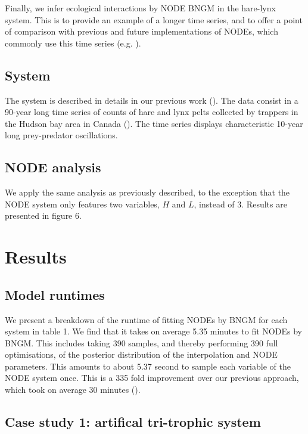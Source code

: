 \documentclass[11pt, oneside]{article}
\begin{document}
Finally, we infer ecological interactions by NODE BNGM in the hare-lynx system.
This is to provide an example of a longer time series, and to offer a point of comparison with previous and future implementations of NODEs, which commonly use this time series (e.g. \cite{Bonnaffe2021a}).

\subsection{System}

The system is described in details in our previous work (\cite{Bonnaffe2021a}).
The data consist in a 90-year long time series of counts of hare and lynx pelts collected by trappers in the Hudson bay area in Canada (\cite{Odum1972}).
The time series displays characteristic 10-year long prey-predator oscillations.

\subsection{NODE analysis}

We apply the same analysis as previously described, to the exception that the NODE system only features two variables, $H$ and $L$, instead of 3.
Results are presented in figure 6.

\section{Results}

\subsection{Model runtimes}

We present a breakdown of the runtime of fitting NODEs by BNGM for each system in table 1.
We find that it takes on average 5.35 minutes to fit NODEs by BNGM.
This includes taking 390 samples, and thereby performing 390 full optimisations, of the posterior distribution of the interpolation and NODE parameters. 
This amounts to about 5.37 second to sample each variable of the NODE system once.
This is a 335 fold improvement over our previous approach, which took on average 30 minutes (\cite{Bonnaffe2021a}).

\subsection{Case study 1: artifical tri-trophic system}
\end{document}

